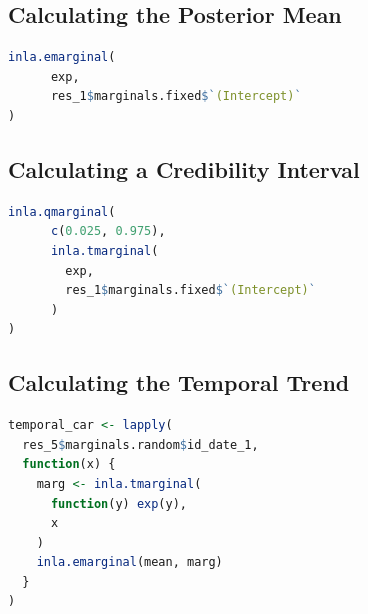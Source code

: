 \subsection{Calculating the Posterior Mean}
\begin{lstlisting}[caption={Calculating the posterior mean of a coefficent.}, label={codePosteriorMean}, language=R]
inla.emarginal(
      exp,
      res_1$marginals.fixed$`(Intercept)`
)
\end{lstlisting}
\subsection{Calculating a Credibility Interval}
\begin{lstlisting}[caption={Extracting the credibility interval for a coefficient}, label={codeCredibility}, language=R]
inla.qmarginal(
      c(0.025, 0.975),
      inla.tmarginal(
        exp,
        res_1$marginals.fixed$`(Intercept)`
      )
)
\end{lstlisting}
\subsection{Calculating the Temporal Trend}
\begin{lstlisting}[caption={Calculating the Temporal Trend of a Model}, label={codeTemporal}, language=R]
temporal_car <- lapply(
  res_5$marginals.random$id_date_1,
  function(x) {
    marg <- inla.tmarginal(
      function(y) exp(y),
      x
    )
    inla.emarginal(mean, marg)
  }
)
\end{lstlisting}
\clearpage